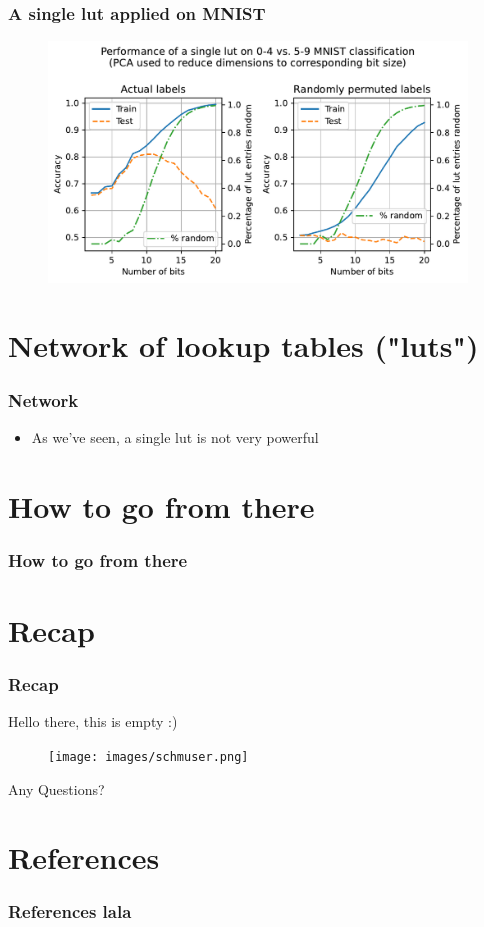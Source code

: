 \documentclass[pdflatex,compress]{beamer}
\begin{document}
\begin{frame}
	\frametitle{A single lut applied on MNIST}
				\begin{figure}
				\centering
				\includegraphics[width=0.99\textwidth,keepaspectratio]{images/single_lut_exp.pdf}
				\end{figure}
\end{frame}

\section{Network of lookup tables ("luts")}


\begin{frame}
	\frametitle{Network}
	\begin{itemize}
		\item As we've seen, a single lut is not very powerful
	\end{itemize}
\end{frame}

\section{How to go from there}

\begin{frame}
\frametitle{How to go from there}
\end{frame}

\section{Recap}
\begin{frame}
	\frametitle{Recap}
	Hello there, this is empty :)
\end{frame}

\begin{frame}
\begin{figure}
\centering
\texttt{[image: images/schmuser.png]}
\end{figure}
\begin{center}
\huge Any Questions?
\end{center}
\end{frame}

\section{References}

\begin{frame}
\frametitle{References lala}
\printbibliography
\end{frame}
\end{document}
